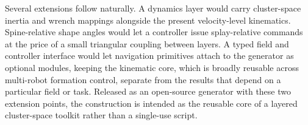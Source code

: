 \documentclass[conference]{IEEEtran}
\begin{document}
Several extensions follow naturally. A dynamics layer would carry cluster-space
inertia and wrench mappings alongside the present velocity-level kinematics.
Spine-relative shape angles would let a controller issue splay-relative commands
at the price of a small triangular coupling between layers. A typed field and
controller interface would let navigation primitives attach to the generator as
optional modules, keeping the kinematic core, which is broadly reusable across
multi-robot formation control, separate from the results that depend on a
particular field or task. Released as an open-source generator with these two
extension points, the construction is intended as the reusable core of a layered
cluster-space toolkit rather than a single-use script.

\end{document}

